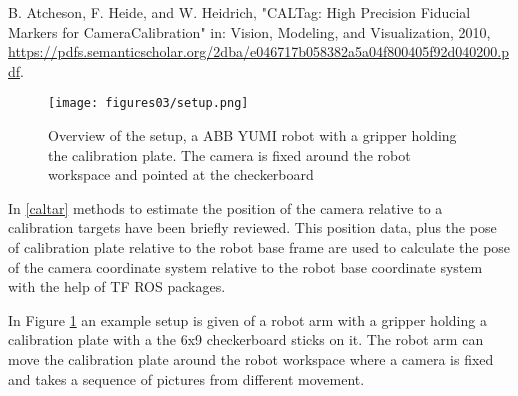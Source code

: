 \iffalse
The new generation of the collaborative robots allow the use of small robot arms working in an asynchronous or synchronous fashion with human workers.  Such an example of the collaborative robot is the YuMi robot, dual 7-DOF robot arms designed for precise manipulation of small parts better known in computer vision as rigid body. For further acceptance of such robots in the industry, some methods and sensors systems have to be developed to allow them to pick parts without the position of the part being known in advance, just as humans do.
This thesis is focused on the implementation of an algorithm for determing the positition of the known parts. We first deal with a robot-camera calibration, then  we propose a method to obtain the ground truth position of known parts. As step in between a 3D model of the known part needs to be created.
\fi


		B. Atcheson, F. Heide, and W. Heidrich,
		"CALTag: High Precision Fiducial Markers for CameraCalibration" in: Vision, Modeling, and Visualization, 2010, \url{https://pdfs.semanticscholar.org/2dba/e046717b058382a5a04f800405f92d040200.pdf}.






\begin{figure}[!h]
\begin{center}
\texttt{[image: figures03/setup.png]}
\caption{Overview of the setup, a ABB YUMI robot with a gripper holding the calibration plate. The camera is fixed around the robot workspace and pointed at the checkerboard}%
\label{fig:setup}
\end{center}
\end{figure}



In \ref{caltar} methods to estimate the position of the camera relative to a calibration targets have been briefly reviewed. This position data, plus the pose of calibration plate relative to the robot base frame are used to calculate the pose of the camera coordinate system relative to the robot base coordinate system with the help of TF ROS packages.




In Figure \ref{fig:setup} an example setup is given of a robot arm with a gripper holding a calibration plate with a the 6x9  checkerboard sticks on it. The robot arm can move the calibration plate around the robot workspace where a camera is fixed and takes a sequence of pictures from different movement.


